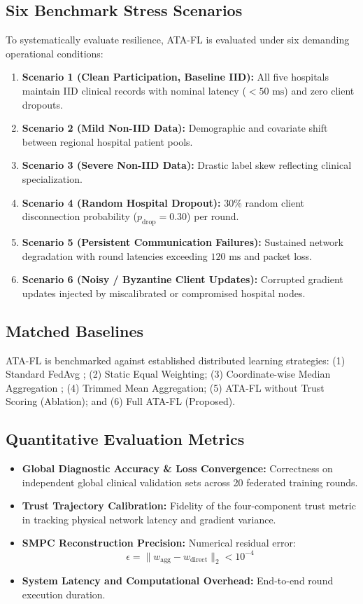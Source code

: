 \documentclass[conference]{IEEEtran}
\begin{document}
\subsection{Six Benchmark Stress Scenarios}
To systematically evaluate resilience, ATA-FL is evaluated under six demanding operational conditions:
\begin{enumerate}
    \item \textbf{Scenario 1 (Clean Participation, Baseline IID):} All five hospitals maintain IID clinical records with nominal latency ($< 50\text{ ms}$) and zero client dropouts.
    \item \textbf{Scenario 2 (Mild Non-IID Data):} Demographic and covariate shift between regional hospital patient pools.
    \item \textbf{Scenario 3 (Severe Non-IID Data):} Drastic label skew reflecting clinical specialization.
    \item \textbf{Scenario 4 (Random Hospital Dropout):} 30\% random client disconnection probability ($p_{\text{drop}} = 0.30$) per round.
    \item \textbf{Scenario 5 (Persistent Communication Failures):} Sustained network degradation with round latencies exceeding $120\text{ ms}$ and packet loss.
    \item \textbf{Scenario 6 (Noisy / Byzantine Client Updates):} Corrupted gradient updates injected by miscalibrated or compromised hospital nodes.
\end{enumerate}

\subsection{Matched Baselines}
ATA-FL is benchmarked against established distributed learning strategies: (1) Standard FedAvg \cite{mcmahan2017communication}; (2) Static Equal Weighting; (3) Coordinate-wise Median Aggregation \cite{blanchard2017machine}; (4) Trimmed Mean Aggregation; (5) ATA-FL without Trust Scoring (Ablation); and (6) Full ATA-FL (Proposed).

\subsection{Quantitative Evaluation Metrics}
\begin{itemize}
    \item \textbf{Global Diagnostic Accuracy \& Loss Convergence:} Correctness on independent global clinical validation sets across 20 federated training rounds.
    \item \textbf{Trust Trajectory Calibration:} Fidelity of the four-component trust metric in tracking physical network latency and gradient variance.
    \item \textbf{SMPC Reconstruction Precision:} Numerical residual error:
    \begin{equation}
    \epsilon = \|w_{\text{agg}} - w_{\text{direct}}\|_2 < 10^{-4}
    \end{equation}
    \item \textbf{System Latency and Computational Overhead:} End-to-end round execution duration.
\end{itemize}
\end{document}
